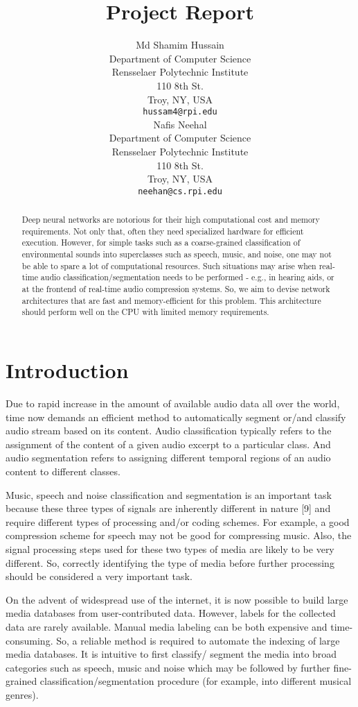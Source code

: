 \documentclass{article}
\title{Project Report}
\author{
Md Shamim Hussain\\
Department of Computer Science\\
Rensselaer Polytechnic Institute\\
110 8th St.\\ Troy, NY, USA\\
\texttt{hussam4@rpi.edu} \\
\And
Nafis Neehal\\
Department of Computer Science\\
Rensselaer Polytechnic Institute\\
110 8th St.\\ Troy, NY, USA\\
\texttt{neehan@cs.rpi.edu} \\
}
\begin{document}
\maketitle

\begin{abstract}
  Deep neural networks are notorious for their high computational cost and memory requirements. Not only that, often they need specialized hardware for efficient execution. However, for simple tasks such as a coarse-grained classification of environmental sounds into superclasses such as speech, music, and noise, one may not be able to spare a lot of computational resources. Such situations may arise when real-time audio classification/segmentation needs to be performed - e.g., in hearing aids, or at the frontend of real-time audio compression systems. So, we aim to devise network architectures that are fast and memory-efficient for this problem. This architecture should perform well on the CPU with limited memory requirements.
\end{abstract}

\section{Introduction}
Due to rapid increase in the amount of available audio data all over the world, time now demands an efficient method to automatically segment or/and classify audio stream based on its content. Audio classification typically refers to the assignment of the content of a given audio excerpt to a particular class. And audio segmentation refers to assigning different temporal regions of an audio content to different classes.  

Music, speech and noise classification and segmentation is an important task because these three types of signals are inherently different in nature [9] and require different types of processing and/or coding schemes. For example, a good compression scheme for speech may not be good for compressing music. Also, the signal processing steps used for these two types of media are likely to be very different. So, correctly identifying the type of media before further processing should be considered a very important task. 

On the advent of widespread use of the internet, it is now possible to build large media databases from user-contributed data. However, labels for the collected data are rarely available. Manual media labeling can be both expensive and time-consuming. So, a reliable method is required to automate the indexing of large media databases. It is intuitive to first classify/ segment the media into broad categories such as speech, music and noise which may be followed by further fine-grained classification/segmentation procedure (for example, into different musical genres). 
\end{document}
